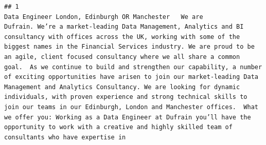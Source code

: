 \documentclass[
]{article}
\begin{document}
\begin{verbatim}
## 1                                                                                                                                                                                                                                                                                                                                                                                                                                                                                                                                                                                                                                                                                                                                                                                                                                                                                                                                                                                                                                                                                                                                                                                                                                                                                                                                                                                                                                                                                                                                                                                                                                                                                                                                                                                                                                                                                                                                                                                                                                                                                                                                                                                                                                                                                                                                                                                                                                                                                                                                                                                      Data Engineer London, Edinburgh OR Manchester   We are Dufrain. We’re a market-leading Data Management, Analytics and BI consultancy with offices across the UK, working with some of the biggest names in the Financial Services industry. We are proud to be an agile, client focused consultancy where we all share a common goal.  As we continue to build and strengthen our capability, a number of exciting opportunities have arisen to join our market-leading Data Management and Analytics Consultancy. We are looking for dynamic individuals, with proven experience and strong technical skills to join our teams in our Edinburgh, London and Manchester offices.  What we offer you: Working as a Data Engineer at Dufrain you’ll have the opportunity to work with a creative and highly skilled team of consultants who have expertise in 
\end{verbatim}
\end{document}
